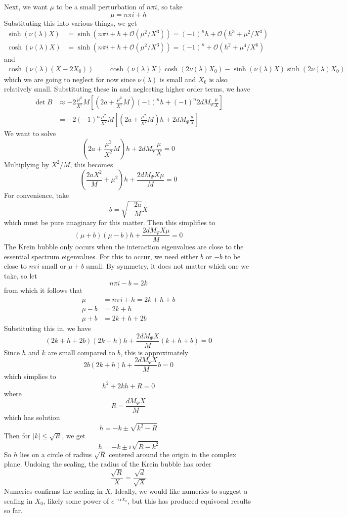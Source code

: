 \documentclass[thesis.tex]{subfiles}
\begin{document}
Next, we want $\mu$ to be a small perturbation of $n \pi i$, so take 
\[
\mu = n \pi i + h
\]
Substituting this into various things, we get
\begin{align*}
\sinh(\nu(\lambda)X) &= \sinh(n \pi i + h + \mathcal{O}(\mu^2 / X^3)) = (-1)^n h + \mathcal{O}(h^3 + \mu^2 / X^3) \\
\cosh(\nu(\lambda)X) &= \sinh(n \pi i + h + \mathcal{O}(\mu^2 / X^3)) = (-1)^n +  \mathcal{O}(h^2 + \mu^4 / X^6)
\end{align*}
and
\begin{align*}
\cosh( \nu(\lambda)(X - 2 X_0))
&= \cosh( \nu(\lambda)X) \cosh(2 \nu(\lambda)X_0) 
- \sinh( \nu(\lambda)X) \sinh(2 \nu(\lambda)X_0) 
\end{align*}
which we are going to neglect for now since $\nu(\lambda)$ is small and $X_0$ is also relatively small. Substituting these in and neglecting higher order terms, we have
\begin{align*}
\det B &\approx -2 \frac{\mu^2}{X^2} M \left[ \left(2a + \frac{\mu^2}{X^2} M\right)(-1)^n h + (-1)^n 2 d M_\Psi \frac{\mu}{X} \right] \\
&= -2 (-1)^n \frac{\mu^2}{X^2} M \left[ \left(2a + \frac{\mu^2}{X^2} M\right) h + 2 d M_\Psi \frac{\mu}{X} \right] 
\end{align*}
We want to solve
\[
\left(2a + \frac{\mu^2}{X^2} M\right) h + 2 d M_\Psi \frac{\mu}{X} = 0
\]
Multiplying by $X^2/M$, this becomes
\[
\left(\frac{2aX^2}{M} + \mu^2 \right) h + \frac{2 d M_\Psi X \mu}{M} = 0
\]
For convenience, take
\[
b = \sqrt{-\frac{2a}{M}}X 
\]
which must be pure imaginary for this matter. Then this simplifies to
\[
(\mu + b)(\mu - b) h + \frac{2 d M_\Psi X \mu}{M} = 0
\]
The Krein bubble only occurs when the interaction eigenvalues are close to the essential spectrum eigenvalues. For this to occur, we need either $b$ or $-b$ to be close to $n \pi i$ small or $\mu + b$ small. By symmetry, it does not matter which one we take, so let
\[
n \pi i - b = 2 k
\]
from which it follows that
\begin{align*}
\mu &= n \pi i + h = 2 k + h + b \\
\mu - b &= 2 k + h \\
\mu + b &= 2 k + h + 2b
\end{align*}
Substituting this in, we have
\[
(2k + h + 2b)(2k + h) h + \frac{2 d M_\Psi X}{M}(k + h + b) = 0
\]
Since $h$ and $k$ are small compared to $b$, this is approximately
\[
2b (2 k + h) h + \frac{2 d M_\Psi X}{M}b = 0
\]
which simplies to
\[
h^2 + 2kh + R = 0
\]
where
\[
R = \frac{d M_\Psi X}{M}
\]
which has solution
\[
h = -k \pm \sqrt{k^2 - R}
\]
Then for $|k| \leq \sqrt{R}$, we get
\[
h = -k \pm i \sqrt{R - k^2}
\]
So $h$ lies on a circle of radius $\sqrt{R}$ centered around the origin in the complex plane. Undoing the scaling, the radius of the Krein bubble has order
\[
\frac{\sqrt{R}}{X} = \frac{\sqrt{d}}{\sqrt{X}}
\] 
Numerics confirms the scaling in $X$. Ideally, we would like numerics to suggest a scaling in $X_0$, likely some power of $e^{-\alpha X_0}$, but this has produced equivocal results so far.
\end{document}
